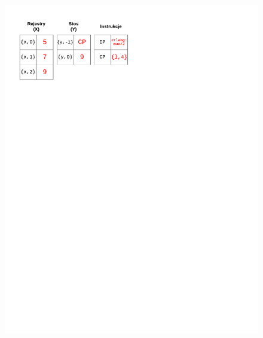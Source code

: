 \begin{figure}
\begin{multicols}{2}
\vspace{-4mm}
\begin{Figure}
 \centering
 \includegraphics[scale=0.65, clip, trim=0 215mm 110mm 0]{interpreter_max_4}
\label{fig:max4}
\end{Figure}


\end{multicols}
\end{figure}
